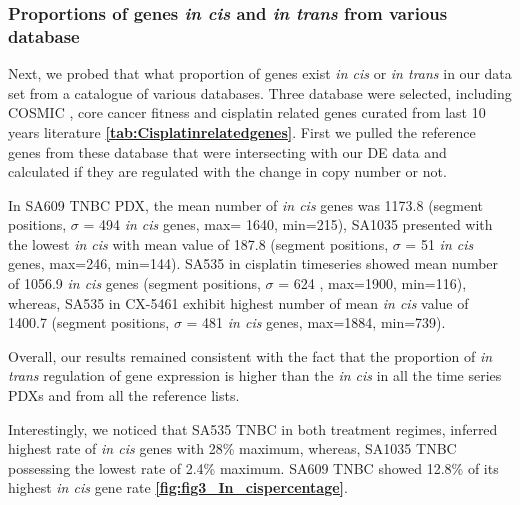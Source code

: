\subsubsection{Proportions of genes \textit{in cis} and \textit{in trans} from various database}
Next, we probed that what proportion of genes exist \textit{in cis} or \textit{in trans} in our data set from a catalogue of various databases.
Three database were selected, including COSMIC \cite{vogelstein2013cancer}, core cancer fitness \cite{behan2019prioritization} and cisplatin related genes curated from last 10 years literature \textbf{\autoref{tab:Cisplatinrelatedgenes}}.
First we pulled the reference genes from these database that were intersecting with our \ac{DE} data and calculated if they are regulated with the change in copy number or not.

 In  SA609 TNBC PDX, the mean number of \textit{in cis} genes was 1173.8 (segment positions, $\sigma$ = 494 \textit{in cis} genes, max= 1640, min=215), SA1035 presented with the lowest \textit{in cis} with
 mean value of 187.8 (segment positions, $\sigma$ = 51 \textit{in cis} genes, max=246, min=144). SA535 in cisplatin timeseries showed mean number of 1056.9 \textit{in cis} genes (segment positions, $\sigma$ = 624 , max=1900, min=116), whereas, SA535 in CX-5461 exhibit highest number of mean \textit{in cis} value of 1400.7 (segment positions, $\sigma$ = 481 \textit{in cis} genes, max=1884, min=739).
 
 Overall, our results remained consistent with the fact that the proportion of \textit{in trans} regulation of gene expression is higher than the \textit{in cis} in all the time series PDXs and from all the reference lists.   
 
 Interestingly, we noticed that SA535 TNBC in both treatment regimes, inferred highest rate of \textit{in cis} genes with 28\% maximum, whereas, SA1035 TNBC possessing the lowest rate of 2.4\% maximum. SA609 TNBC showed 12.8\% of its highest \textit{in cis} gene rate \textbf{\autoref{fig:fig3_In_cispercentage}}.



